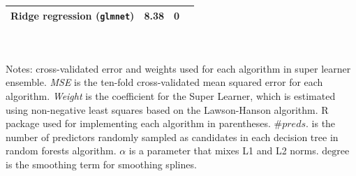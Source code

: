 \documentclass[hidelinks,12pt]{article}
\begin{document}
\begin{appendices}
\begin{table}[h]
\begin{tabularx}{\linewidth}{l*{3}{Y}}
	Ridge regression (\texttt{glmnet})  & 8.38 & 0 \\ 
	\hline
	\bottomrule
\end{tabularx}\\ \\
\footnotesize{Notes: cross-validated error and weights used for each algorithm in super learner ensemble. \textit{MSE} is the ten-fold cross-validated mean squared error for each algorithm. \textit{Weight} is the coefficient for the Super Learner, which is estimated using non-negative least squares based on the Lawson-Hanson algorithm. \textsf{R} package used for implementing each algorithm in parentheses. $\# preds.$ is the number of predictors randomly sampled as candidates in each decision tree in random forests algorithm. $\alpha$ is a parameter that mixes L1 and L2 norms. $\text{degree}$ is the smoothing term for smoothing splines.}
\end{table}

\pagebreak


\end{appendices}
\end{document}
